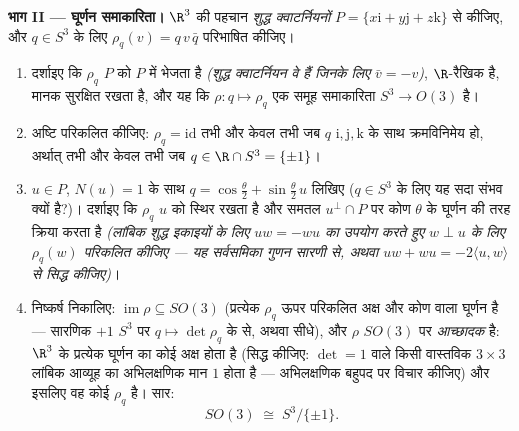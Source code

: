 \begin{problem}
\medskip
\noindent\textbf{भाग II --- घूर्णन समाकारिता।} $\R^3$ की पहचान
\emph{शुद्ध क्वाटर्नियनों} $P = \{x\mathrm i +
y\mathrm j + z\mathrm k\}$ से कीजिए, और $q \in S^3$ के लिए $\rho_q(v) = q\,v\,\bar q$
परिभाषित कीजिए।
\begin{enumerate}[resume]
  \item दर्शाइए कि $\rho_q$ $P$ को $P$ में भेजता है \emph{(शुद्ध
        क्वाटर्नियन वे हैं जिनके लिए $\bar v = -v$)}, $\R$-रैखिक है,
        मानक सुरक्षित रखता है, और यह कि $\rho
        \colon q \mapsto \rho_q$ एक समूह समाकारिता
        $S^3
        \to O(3)$ है।
  \item अष्टि परिकलित कीजिए: $\rho_q = \mathrm{id}$ तभी और केवल तभी जब $q$
        $\mathrm i, \mathrm j, \mathrm k$ के साथ क्रमविनिमेय हो, अर्थात् तभी और केवल तभी जब
        $q \in \R\cap S^3 = \{\pm1\}$।
  \item $u \in P$, $N(u) = 1$ के साथ $q = \cos\frac\theta2 + \sin\frac\theta2\,u$ लिखिए ($q \in S^3$ के लिए यह सदा संभव
        क्यों है?)। दर्शाइए कि $\rho_q$ $u$ को स्थिर रखता है और
        समतल $u^\perp\cap P$ पर कोण $\theta$ के घूर्णन की तरह क्रिया करता है
        \emph{(लांबिक शुद्ध इकाइयों के लिए $uw = -wu$ का उपयोग करते
        हुए $w \perp u$ के लिए $\rho_q(w)$ परिकलित कीजिए --- यह सर्वसमिका
        गुणन सारणी से, अथवा $uw + wu =
        -2\langle u, w\rangle$ से सिद्ध कीजिए)}।
  \item निष्कर्ष निकालिए: $\operatorname{im}\rho \subseteq SO(3)$ (प्रत्येक $\rho_q$ ऊपर परिकलित अक्ष
        और कोण वाला घूर्णन है --- सारणिक $+1$  $S^3$ पर
        $q
        \mapsto \det\rho_q$ के  से, अथवा सीधे), और $\rho$ $SO(3)$ पर
        \emph{आच्छादक} है: $\R^3$ के प्रत्येक घूर्णन का कोई अक्ष
        होता है (सिद्ध कीजिए: $\det = 1$ वाले किसी वास्तविक $3\times3$
        लांबिक आव्यूह का अभिलक्षणिक मान $1$ होता है ---
        अभिलक्षणिक बहुपद पर विचार कीजिए) और इसलिए वह कोई $\rho_q$
        है। सार:
        \[
        SO(3) \;\cong\; S^3/\{\pm 1\} .
        \]
\end{enumerate}


\end{problem}
